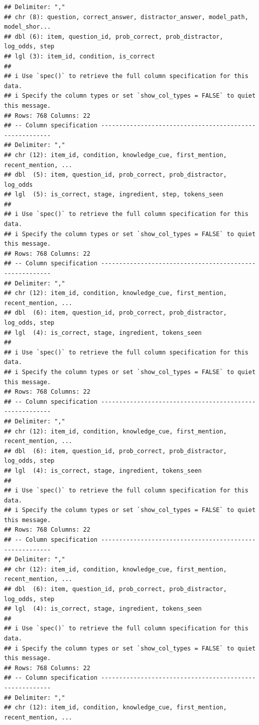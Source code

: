 \documentclass[
]{article}
\begin{document}
\begin{verbatim}
## Delimiter: ","
## chr (8): question, correct_answer, distractor_answer, model_path, model_shor...
## dbl (6): item, question_id, prob_correct, prob_distractor, log_odds, step
## lgl (3): item_id, condition, is_correct
## 
## i Use `spec()` to retrieve the full column specification for this data.
## i Specify the column types or set `show_col_types = FALSE` to quiet this message.
## Rows: 768 Columns: 22
## -- Column specification --------------------------------------------------------
## Delimiter: ","
## chr (12): item_id, condition, knowledge_cue, first_mention, recent_mention, ...
## dbl  (5): item, question_id, prob_correct, prob_distractor, log_odds
## lgl  (5): is_correct, stage, ingredient, step, tokens_seen
## 
## i Use `spec()` to retrieve the full column specification for this data.
## i Specify the column types or set `show_col_types = FALSE` to quiet this message.
## Rows: 768 Columns: 22
## -- Column specification --------------------------------------------------------
## Delimiter: ","
## chr (12): item_id, condition, knowledge_cue, first_mention, recent_mention, ...
## dbl  (6): item, question_id, prob_correct, prob_distractor, log_odds, step
## lgl  (4): is_correct, stage, ingredient, tokens_seen
## 
## i Use `spec()` to retrieve the full column specification for this data.
## i Specify the column types or set `show_col_types = FALSE` to quiet this message.
## Rows: 768 Columns: 22
## -- Column specification --------------------------------------------------------
## Delimiter: ","
## chr (12): item_id, condition, knowledge_cue, first_mention, recent_mention, ...
## dbl  (6): item, question_id, prob_correct, prob_distractor, log_odds, step
## lgl  (4): is_correct, stage, ingredient, tokens_seen
## 
## i Use `spec()` to retrieve the full column specification for this data.
## i Specify the column types or set `show_col_types = FALSE` to quiet this message.
## Rows: 768 Columns: 22
## -- Column specification --------------------------------------------------------
## Delimiter: ","
## chr (12): item_id, condition, knowledge_cue, first_mention, recent_mention, ...
## dbl  (6): item, question_id, prob_correct, prob_distractor, log_odds, step
## lgl  (4): is_correct, stage, ingredient, tokens_seen
## 
## i Use `spec()` to retrieve the full column specification for this data.
## i Specify the column types or set `show_col_types = FALSE` to quiet this message.
## Rows: 768 Columns: 22
## -- Column specification --------------------------------------------------------
## Delimiter: ","
## chr (12): item_id, condition, knowledge_cue, first_mention, recent_mention, ...

\end{verbatim}
\end{document}
